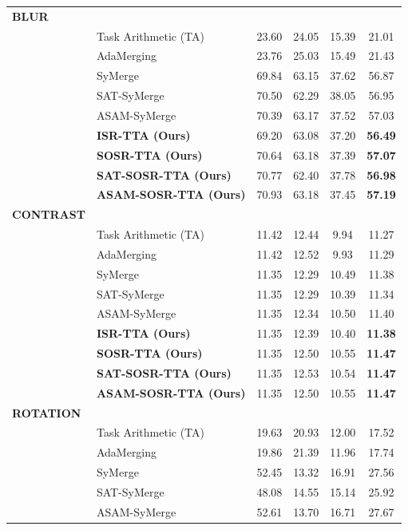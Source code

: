 \documentclass{article}
\theoremstyle{plain}
\theoremstyle{definition}
\theoremstyle{remark}
\begin{document}
\begin{table}[t]
\begin{center}
\begin{small}
\begin{tabular}{llcccc}
\midrule
\textbf{BLUR} & & & & & \\
 & \quad Task Arithmetic (TA) & 23.60 & 24.05 & 15.39 & 21.01 \\
 & \quad AdaMerging & 23.76 & 25.03 & 15.49 & 21.43 \\
 & \quad SyMerge & 69.84 & 63.15 & 37.62 & 56.87 \\
 & \quad SAT-SyMerge & 70.50 & 62.29 & 38.05 & 56.95 \\
 & \quad ASAM-SyMerge & 70.39 & 63.17 & 37.52 & 57.03 \\
 & \quad \textbf{ISR-TTA (Ours)} & 69.20 & 63.08 & 37.20 & \textbf{56.49} \\
 & \quad \textbf{SOSR-TTA (Ours)} & 70.64 & 63.18 & 37.39 & \textbf{57.07} \\
 & \quad \textbf{SAT-SOSR-TTA (Ours)} & 70.77 & 62.40 & 37.78 & \textbf{56.98} \\
 & \quad \textbf{ASAM-SOSR-TTA (Ours)} & 70.93 & 63.18 & 37.45 & \textbf{57.19} \\
\midrule
\textbf{CONTRAST} & & & & & \\
 & \quad Task Arithmetic (TA) & 11.42 & 12.44 & 9.94 & 11.27 \\
 & \quad AdaMerging & 11.42 & 12.52 & 9.93 & 11.29 \\
 & \quad SyMerge & 11.35 & 12.29 & 10.49 & 11.38 \\
 & \quad SAT-SyMerge & 11.35 & 12.29 & 10.39 & 11.34 \\
 & \quad ASAM-SyMerge & 11.35 & 12.34 & 10.50 & 11.40 \\
 & \quad \textbf{ISR-TTA (Ours)} & 11.35 & 12.39 & 10.40 & \textbf{11.38} \\
 & \quad \textbf{SOSR-TTA (Ours)} & 11.35 & 12.50 & 10.55 & \textbf{11.47} \\
 & \quad \textbf{SAT-SOSR-TTA (Ours)} & 11.35 & 12.53 & 10.54 & \textbf{11.47} \\
 & \quad \textbf{ASAM-SOSR-TTA (Ours)} & 11.35 & 12.50 & 10.55 & \textbf{11.47} \\
\midrule
\textbf{ROTATION} & & & & & \\
 & \quad Task Arithmetic (TA) & 19.63 & 20.93 & 12.00 & 17.52 \\
 & \quad AdaMerging & 19.86 & 21.39 & 11.96 & 17.74 \\
 & \quad SyMerge & 52.45 & 13.32 & 16.91 & 27.56 \\
 & \quad SAT-SyMerge & 48.08 & 14.55 & 15.14 & 25.92 \\
 & \quad ASAM-SyMerge & 52.61 & 13.70 & 16.71 & 27.67 \\

\end{tabular}
\end{small}
\end{center}
\end{table}
\end{document}

